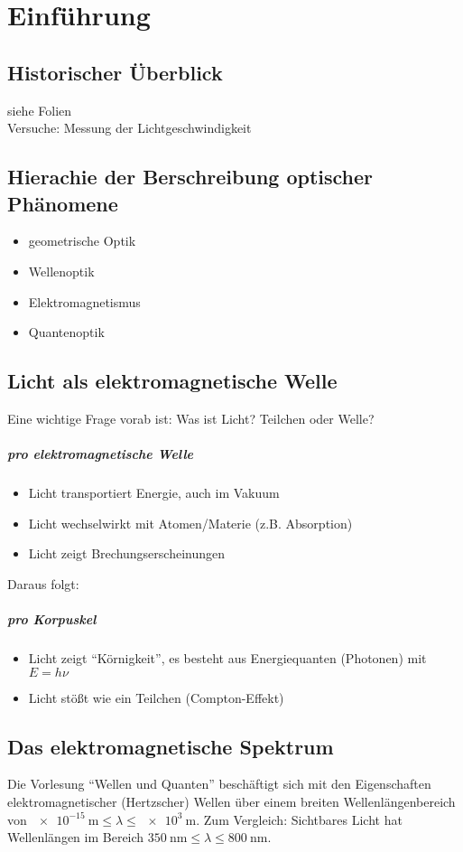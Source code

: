 \chapter{Einführung}
\section{Historischer Überblick}
siehe Folien\\
Versuche: Messung der Lichtgeschwindigkeit

\section{Hierachie der Berschreibung optischer Phänomene}
\begin{itemize}
	\item geometrische Optik
	\item Wellenoptik
	\item Elektromagnetismus
	\item Quantenoptik
\end{itemize}

\section{Licht als elektromagnetische Welle}
Eine wichtige Frage vorab ist:
Was ist Licht? Teilchen oder Welle?

\paragraph{pro elektromagnetische Welle}
\begin{itemize}
	\item Licht transportiert Energie, auch im Vakuum
	\item Licht wechselwirkt mit Atomen/Materie (z.B. 		Absorption)
	\item Licht zeigt Brechungserscheinungen
\end{itemize}
Daraus folgt: 

\paragraph{pro Korpuskel}
\begin{itemize}
	\item Licht zeigt \enquote{Körnigkeit}, 
      es besteht aus Energiequanten (Photonen) mit $E=h\nu$
	\item Licht stößt wie ein Teilchen (Compton-Effekt)
\end{itemize}

\section{Das elektromagnetische Spektrum}
Die Vorlesung \enquote{Wellen und Quanten} beschäftigt sich mit den
Eigenschaften elektromagnetischer (Hertzscher) Wellen über einem breiten
Wellenlängenbereich von
$\SI{e-15}{\m} \leq \lambda\leq \SI{e3}{\m}$.
Zum Vergleich: Sichtbares Licht hat Wellenlängen im Bereich
$\SI{350}{\nano\m} \leq \lambda \leq \SI{800}{\nano\m}$.

